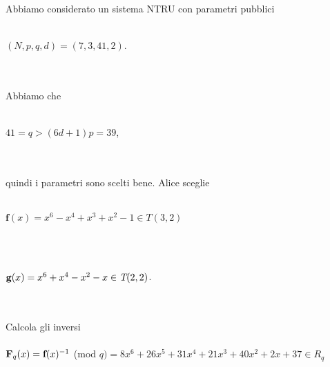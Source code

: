 \documentclass[a4paper,12pt]{report}
\theoremstyle{plain}
\theoremstyle{definition}
\theoremstyle{remark}
\begin{document}
Abbiamo considerato un sistema NTRU con parametri pubblici \\\\ \centerline{$(N, p, q, d)=(7, 3, 41, 2)$.}\\ \\ Abbiamo che\\ \\ \centerline{$41=q>(6d+1)p=39$,}\\ \\ quindi i parametri sono scelti bene. Alice sceglie \\ \\ \centerline{$\textbf{f}(x)=x^6-x^4+x^3+x^2-1\in\textit{T}(3,2)$}\\ \\ \centerline{$\textbf g(x)=x^6+x^4-x^2-x\in\textit{T}(2,2)$.} \\ \\Calcola gli inversi \\ \\ $\textbf F_	q(x)=\textbf f(x)^{-1} $ (mod $q)=8x^6+26x^5+31x^4+21x^3+40x^2+2x+37\in R_q$
\end{document}
